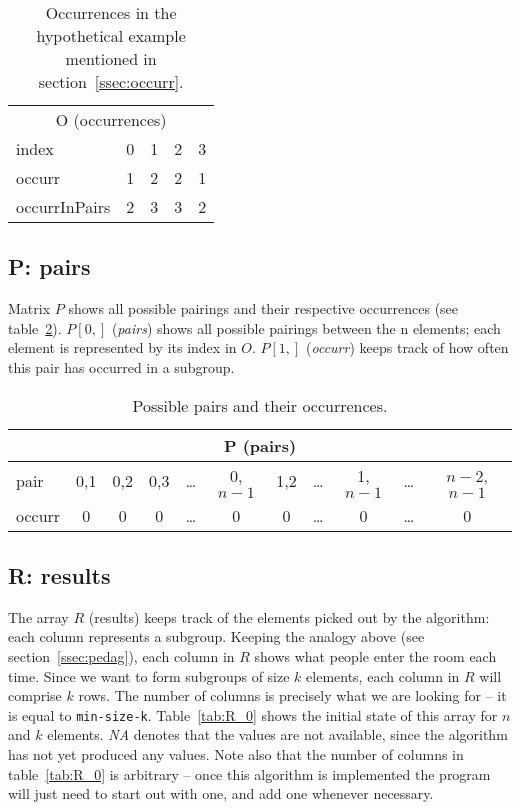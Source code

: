 \documentclass[a4paper]{article}
\begin{document}
\begin{table}
\centering
\begin{tabular} {| l ||c |c |c |c |}  
\multicolumn{ 5 }{c}{O (occurrences) } \\  
\multicolumn{1}{l}{index} & \multicolumn{1}{c}{0} & \multicolumn{1}{c}{1} & \multicolumn{1}{c}{2} & \multicolumn{1}{c}{3} \\ \hline 
occurr & 1 & 2 & 2 & 1 \\ \hline 
occurrInPairs & 2 & 3 & 3 & 2  \\ \hline 
\end{tabular}  
\caption{
Occurrences in the hypothetical example mentioned in section~\ref{ssec:occurr}.
}
\label{tab:O_1}
\end{table}


\subsection{P: pairs}

Matrix $P$ shows all possible pairings and their respective occurrences (see table~\ref{tab:P_0}). 
$P[0,]$ (\emph{pairs}) shows all possible pairings between the n elements; each element is represented by its index in $O$. 
$P[1,]$ (\emph{occurr}) keeps track of how often this pair has occurred in a subgroup.

\begin{table}
\centering
\begin{tabular} {| l ||c |c |c |c |c |c |c |c |c |c |}  
\multicolumn{ 11 }{c}{ P (pairs) } \\ \hline 
pair & 0,1 & 0,2 & 0,3 & \ldots & 0,$n-1$ & 1,2 & \ldots & 1,$n-1$ & \ldots & $n-2$,$n-1$ \\ \hline 
occurr & 0 & 0 & 0 & \ldots & 0 & 0 & \ldots & 0 & \ldots & 0 \\ \hline 
\end{tabular}  
\caption{Possible pairs and their occurrences.
}
\label{tab:P_0}
\end{table}


\subsection{R: results}
\label{ssect:R}

The array $R$ (results) keeps track of the elements picked out by the algorithm: each column represents a subgroup.
Keeping the analogy above (see section~\ref{ssec:pedag}), each column in $R$ shows what people enter the room each time.
Since we want to form subgroups of size $k$ elements, each column in $R$ will comprise $k$ rows.
The number of columns is precisely what we are looking for -- it is equal to \verb:min-size-k:.
Table~\ref{tab:R_0} shows the initial state of this array for $n$ and $k$ elements.
\emph{NA} denotes that the values are not available, since the algorithm has not yet produced any values.
Note also that the number of columns in table~\ref{tab:R_0} is arbitrary -- once this algorithm is implemented the program will just need to start out with one, and add one whenever necessary.
\end{document}
